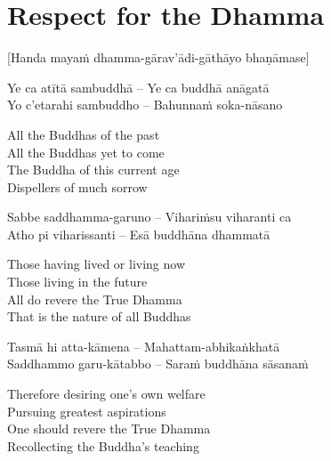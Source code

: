 
\section{Respect for the Dhamma}
\label{respect-for-the-dhamma}

\begin{center}
  [Handa mayaṁ dhamma-gārav’ādi-gāthāyo bhaṇāmase]
\end{center}

\begin{twochants}
  Ye ca atītā sambuddhā – Ye ca buddhā anāgatā \\
  Yo c'etarahi sambuddho – Bahunnaṁ soka-nāsano \\
\end{twochants}

\begin{english}
  All the Buddhas of the past\\
  All the Buddhas yet to come\\
  The Buddha of this current age\\
  Dispellers of much sorrow
\end{english}

\begin{twochants}
  Sabbe saddhamma-garuno – Vihariṁsu viharanti ca\\
  Atho pi viharissanti – Esā buddhāna dhammatā\\
\end{twochants}

\begin{english}
  Those having lived or living now\\
  Those living in the future\\
  All do revere the True Dhamma\\
  That is the nature of all Buddhas
\end{english}

\begin{twochants}
  Tasmā hi atta-kāmena – Mahattam-abhikaṅkhatā\\
  Saddhammo garu-kātabbo – Saraṁ buddhāna sāsanaṁ\\
\end{twochants}

\begin{english}
  Therefore desiring one's own welfare\\
  Pursuing greatest aspirations\\
  One should revere the True Dhamma\\
  Recollecting the Buddha's teaching
\end{english}

